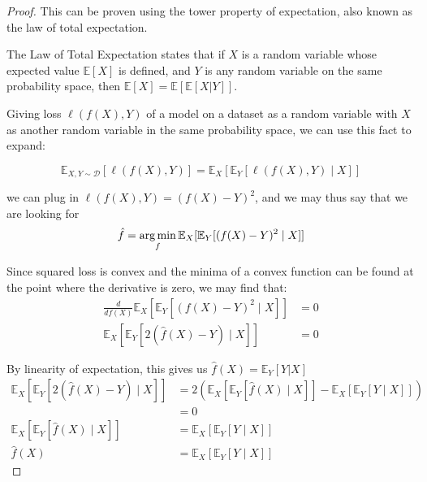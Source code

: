 \begin{proof}

\noindent
  This can be proven using the tower property of expectation, also known as the law of total expectation. 

\begin{fact}
The Law of Total Expectation states that if $X$ is a random variable whose expected value $\mathbb{E}[X]$ is defined, and $Y$ is any random variable on the same probability space, then $\mathbb{E}[X] = \mathbb{E}[\mathbb{E}[X|Y]]$.
\end{fact}

\noindent
Giving loss $\ell(f(X), Y)$ of a model on a dataset as a random variable with $X$ as another random variable in the same probability space, we can use this fact to expand:

$$
\mathbb{E}_{X, Y \sim \mathcal{D}}[\ell(f(X), Y)]=\mathbb{E}_X[\mathbb{E}_Y[\ell(f(X), Y) \mid X]]
$$


 we can plug in $\ell(f(X), Y) = (f(X) - Y)^2$, and we may thus say that we are looking for 
$$\hat{f} = \operatorname*{arg\,min}_f \mathbb{E}_X[\mathbb{E}_Y[(f(X) - Y)^2 \mid X]]$$

\noindent
Since squared loss is convex and the minima of a convex function can be found at the point where the derivative is zero, we may find that:
\begin{align*}
    \frac{d}{df(X)} \mathbb{E}_X[\mathbb{E}_Y[(f(X) - Y)^2 \mid X]] &= 0 \\
    \mathbb{E}_X[\mathbb{E}_Y[2 (\hat{f}(X) - Y) \mid X]] &= 0
\end{align*}

\noindent
By linearity of expectation, this gives us $\hat{f}(X) = \mathbb{E}_Y[Y | X]$
\begin{align*}
    \mathbb{E}_X [\mathbb{E}_Y[2 (\hat{f}(X) - Y) \mid X]] &= 2 (\mathbb{E}_X [\mathbb{E}_Y[\hat{f}(X) \mid X]] - \mathbb{E}_X [\mathbb{E}_Y[Y \mid X]]) \\
    &= 0 \\
    \mathbb{E}_X [\mathbb{E}_Y[\hat{f}(X) \mid X]] &= \mathbb{E}_X [\mathbb{E}_Y[Y \mid X]] \\
    \hat{f}(X) &= \mathbb{E}_X [\mathbb{E}_Y[Y \mid X]]
\end{align*}



\end{proof}
